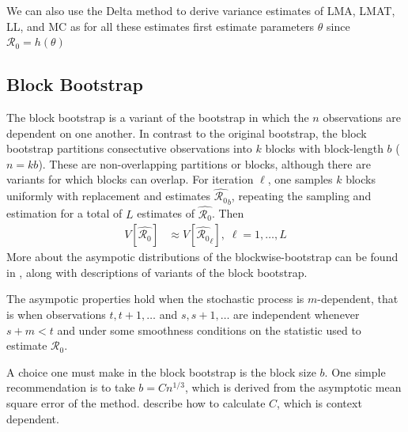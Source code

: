 \documentclass[12pt]{article}
\newcommand{\rr}{\ensuremath{\mathcal{R}_0}}
\begin{document}
We can also use the Delta method to derive variance estimates of LMA, LMAT, LL, and MC as for all these estimates first estimate parameters $\theta$ since $\rr= h(\theta)$

\subsection{Block Bootstrap}

The block bootstrap is a variant of the bootstrap in which the $n$ observations are dependent on one another.  In contrast to the original bootstrap, the block bootstrap partitions consectutive observations into $k$ blocks with block-length $b$ ($n=kb$).  These are non-overlapping partitions or blocks, although there are variants for which blocks can overlap.  For iteration $\ell$, one samples $k$ blocks uniformly with replacement and estimates $\hat{\rr}_b$, repeating the sampling and estimation for a total of $L$ estimates of $\hat{\rr}$.  Then
\begin{align*}
  V\left [ \hat{\rr} \right ] &\approx V\left [\hat{\rr}_\ell \right ], \; \ell = 1, \dots, L
\end{align*}
More about the asympotic distributions of the blockwise-bootstrap can be found in \cite{cao1999}, along with descriptions of variants of the block bootstrap.

The asympotic properties hold when the stochastic process is $m$-dependent, that is when observations $t, t+1, \dots$ and $s, s+1, \dots$ are independent whenever $s+m < t$ and under some smoothness conditions on the statistic used to estimate $\rr$.

A choice one must make in the block bootstrap is the block size $b$.  One simple recommendation is to take $b= Cn^{1/3}$, which is derived from the asymptotic mean square error of the method.  \cite{hall1995} describe how to calculate $C$, which is context dependent.
\end{document}
